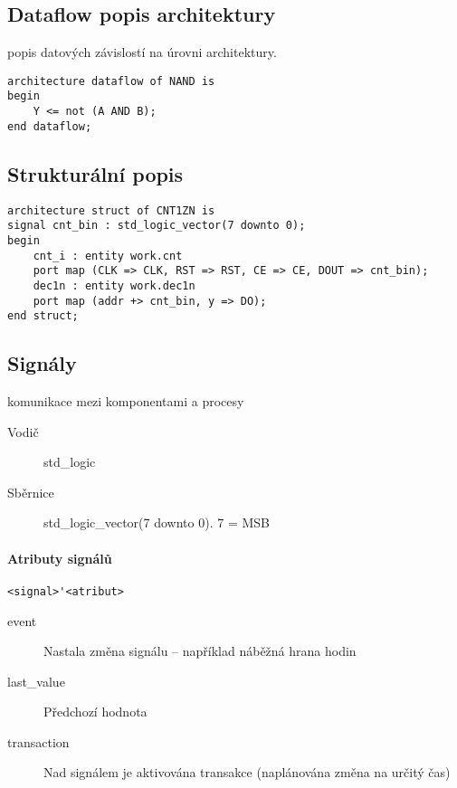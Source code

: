 \documentclass[a4paper, 11pt]{report}
\begin{document}
\subsection{Dataflow popis architektury}

popis datových závislostí na úrovni architektury.

\begin{lstlisting}
architecture dataflow of NAND is
begin
	Y <= not (A AND B);
end dataflow;
\end{lstlisting}

\subsection{Strukturální popis}

\begin{lstlisting}
architecture struct of CNT1ZN is
signal cnt_bin : std_logic_vector(7 downto 0);
begin
	cnt_i : entity work.cnt
	port map (CLK => CLK, RST => RST, CE => CE, DOUT => cnt_bin);
	dec1n : entity work.dec1n
	port map (addr +> cnt_bin, y => DO);
end struct;
\end{lstlisting}

\subsection{Signály}

komunikace mezi komponentami a procesy

\begin{description}
	\item[Vodič] std\_logic
	\item[Sběrnice] std\_logic\_vector(7 downto 0). 7 = MSB
\end{description}

\paragraph{Atributy signálů}

\verb|<signal>'<atribut>|

\begin{description}
	\item[event] Nastala změna signálu -- například náběžná hrana hodin
	\item[last\_value] Předchozí hodnota
	\item[transaction] Nad signálem je aktivována transakce (naplánována změna na určitý čas)
\end{description}
\end{document}
